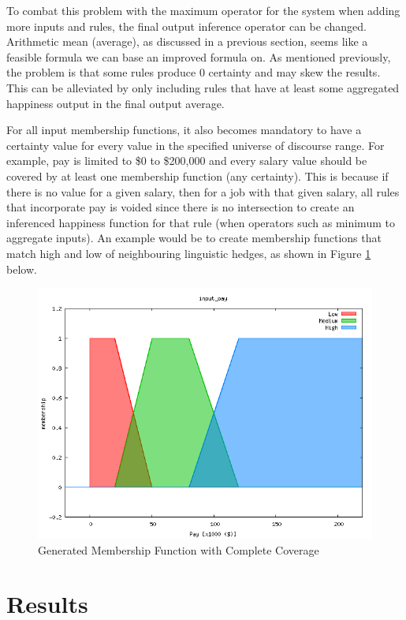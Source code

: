 \documentclass[12pt,fleqn,reqno,letterpaper]{article}
\begin{document}
To combat this problem with the maximum operator for the system when adding more inputs and rules, the final output inference operator can be changed. Arithmetic mean (average), as discussed in a previous section, seems like a feasible formula we can base an improved formula on. As mentioned previously, the problem is that some rules produce 0 certainty and may skew the results. This can be alleviated by only including rules that have at least some aggregated happiness output in the final output average.

For all input membership functions, it also becomes mandatory to have a certainty value for every value in the specified universe of discourse range. For example, pay is limited to \$0 to \$200,000 and every salary value should be covered by at least one membership function (any certainty). This is because if there is no value for a given salary, then for a job with that given salary, all rules that incorporate pay is voided since there is no intersection to create an inferenced happiness function for that rule (when operators such as minimum to aggregate inputs). An example would be to create membership functions that match high and low of neighbouring linguistic hedges, as shown in Figure \ref{fig:HIDE-GAPS} below.

\begin{figure}[H]
  \centering
  \includegraphics[scale=0.5,natwidth=640,natheight=480]{fig/HIDE_GAPS.png}
  \caption{Generated Membership Function with Complete Coverage}
  \label{fig:HIDE-GAPS}
\end{figure}

\section{Results}
\end{document}
